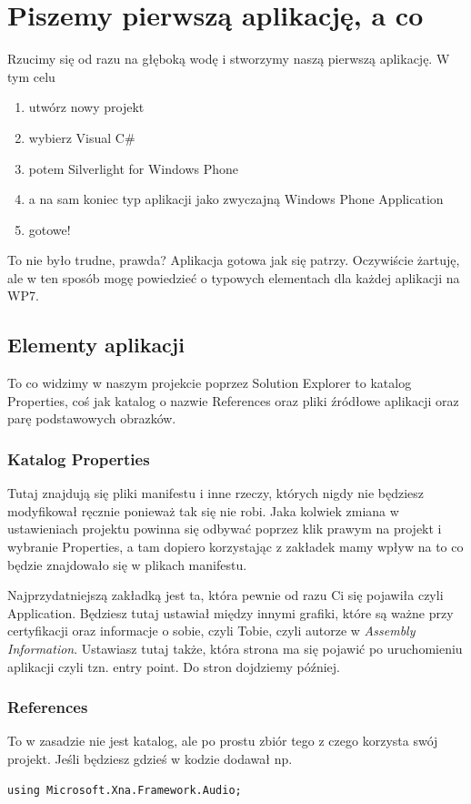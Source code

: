 \documentclass[12pt, a4paper]{article}
\begin{document}
\section{Piszemy pierwszą aplikację, a co}
Rzucimy się od razu na głęboką wodę i stworzymy naszą pierwszą aplikację.
W tym celu
\begin{enumerate}
  \item utwórz nowy projekt
  \item wybierz Visual C\#
  \item potem Silverlight for Windows Phone
  \item a na sam koniec typ aplikacji jako zwyczajną Windows Phone Application
  \item gotowe!
\end{enumerate}

To nie było trudne, prawda? Aplikacja gotowa jak się patrzy. Oczywiście żartuję,
ale w ten sposób mogę powiedzieć o typowych elementach dla każdej aplikacji na
WP7.
\subsection{Elementy aplikacji}
To co widzimy w naszym projekcie poprzez Solution Explorer to katalog
Properties, coś jak katalog o nazwie References oraz pliki źródłowe aplikacji
oraz parę podstawowych obrazków.

\subsubsection{Katalog Properties}
Tutaj znajdują się pliki manifestu i inne rzeczy, których nigdy nie będziesz
modyfikował ręcznie ponieważ tak się nie robi. Jaka kolwiek zmiana w
ustawieniach projektu powinna się odbywać poprzez klik prawym na projekt i
wybranie Properties, a tam dopiero korzystając z zakładek mamy wpływ na to co
będzie znajdowało się w plikach manifestu.

Najprzydatniejszą zakładką jest ta, która pewnie od razu Ci się pojawiła czyli
 Application. Będziesz tutaj ustawiał między innymi grafiki, które są ważne przy
 certyfikacji oraz informacje o sobie, czyli Tobie, czyli autorze w
 \emph{Assembly Information}. 
Ustawiasz tutaj także, która strona ma się pojawić po uruchomieniu
aplikacji czyli tzn. entry point. Do stron dojdziemy później.

\subsubsection{References}
To w zasadzie nie jest katalog, ale po prostu zbiór tego z czego korzysta swój
projekt. Jeśli będziesz gdzieś w kodzie dodawał np.
\begin{lstlisting}
using Microsoft.Xna.Framework.Audio;
\end{lstlisting} 
\end{document}
